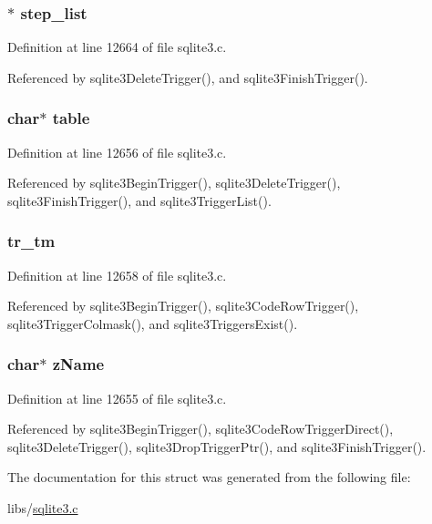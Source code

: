 \subsubsection[{step\+\_\+list}]{$\ast$ step\+\_\+list}\label{struct_trigger_a1864547b78df5071eee17260d8dd5631}


Definition at line 12664 of file sqlite3.\+c.



Referenced by sqlite3\+Delete\+Trigger(), and sqlite3\+Finish\+Trigger().

\hypertarget{struct_trigger_abc4810aa7718733bfc48b1973f4c92f8}{}
\subsubsection[{table}]{\setlength{\rightskip}{0pt plus 5cm}char$\ast$ table}\label{struct_trigger_abc4810aa7718733bfc48b1973f4c92f8}


Definition at line 12656 of file sqlite3.\+c.



Referenced by sqlite3\+Begin\+Trigger(), sqlite3\+Delete\+Trigger(), sqlite3\+Finish\+Trigger(), and sqlite3\+Trigger\+List().

\hypertarget{struct_trigger_a98ed40aa0adcb5616ec4499aaab16f3a}{}
\subsubsection[{tr\+\_\+tm}]{ tr\+\_\+tm}\label{struct_trigger_a98ed40aa0adcb5616ec4499aaab16f3a}


Definition at line 12658 of file sqlite3.\+c.



Referenced by sqlite3\+Begin\+Trigger(), sqlite3\+Code\+Row\+Trigger(), sqlite3\+Trigger\+Colmask(), and sqlite3\+Triggers\+Exist().

\hypertarget{struct_trigger_a661118d86ac4127d40bf3be78d92117d}{}
\subsubsection[{z\+Name}]{\setlength{\rightskip}{0pt plus 5cm}char$\ast$ z\+Name}\label{struct_trigger_a661118d86ac4127d40bf3be78d92117d}


Definition at line 12655 of file sqlite3.\+c.



Referenced by sqlite3\+Begin\+Trigger(), sqlite3\+Code\+Row\+Trigger\+Direct(), sqlite3\+Delete\+Trigger(), sqlite3\+Drop\+Trigger\+Ptr(), and sqlite3\+Finish\+Trigger().



The documentation for this struct was generated from the following file\+:\begin{DoxyCompactItemize}
\item 
libs/\hyperlink{sqlite3_8c}{sqlite3.\+c}\end{DoxyCompactItemize}
